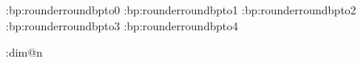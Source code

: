 \set:bp:rounder{roundbpto}{0}
\set:bp:rounder{roundbpto}{1}
\set:bp:rounder{roundbpto}{2}
\set:bp:rounder{roundbpto}{3}
\set:bp:rounder{roundbpto}{4}

\def\roundbpto#1{\csname roundbpto:#1\endcsname}

\def\enablebpround{\let\tobp\roundbp}
\def\disablebpround{\let\tobp\asbp}
\def\setbpround#1{\expandafter\let\expandafter\tobp\csname roundbpto:\the\numexpr#1\relax\endcsname}


\enablebpround


\def\savebp#1{%
 \def\s@vebp{%
  \edef#1{\tobp{\bp:dim@n}}}%
 \afterassignment\s@vebp\bp:dim@n}

\newdimen\bp:dim@n



\def\absint{\expandnumexprafter\absoluteint}
\def\absoluteint#1{\numexpr\ifnum#1<\z@-\fi#1}
\def\absdim{\expanddimexprafter\absolutedim}
\def\absolutedim#1{\dimexpr\ifdim#1<\z@-\fi#1}


\def\expanddivisionafter#1#2#3{%
 \expandnumexprafter#1{#2/#3}{#2}{#3}}

\def\divfloor{\expandtwonumexprafter\dividefloor}
\def\dividefloor{\expanddivisionafter\divide:fl@@r}
\def\divide:fl@@r#1#2#3{%
 \numexpr#1%
 \ifcase\ifnum#2<0 \ifnum#3<0 1 \else 0 \fi
        \else      \ifnum#3<0 1 \else 0 \fi \fi
 \ifnum\numexpr#1*#3>#2-\@ne\fi\or
 \ifnum\numexpr#1*#3<#2-\@ne\fi\fi}

\def\divceil{\expandtwonumexprafter\divideceil}
\def\divideceil{\expanddivisionafter\divide:c@il}
\def\divide:c@il#1#2#3{%
 \numexpr#1%
 \ifcase\ifnum#2<0 \ifnum#3<0 1 \else 0 \fi
        \else      \ifnum#3<0 1 \else 0 \fi \fi
 \ifnum\numexpr#1*#3<#2+\@ne\fi\or
 \ifnum\numexpr#1*#3>#2+\@ne\fi\fi}

